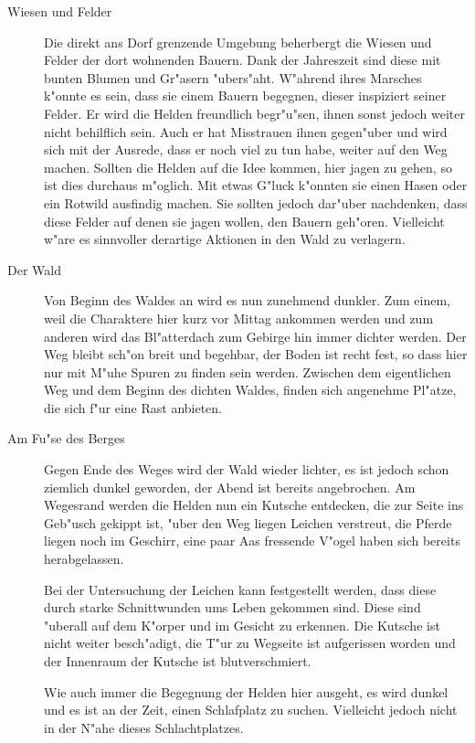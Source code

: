 \begin{description}
\item [Wiesen und Felder] Die direkt ans Dorf grenzende Umgebung beherbergt die Wiesen und Felder der dort wohnenden Bauern. Dank der Jahreszeit sind diese mit bunten Blumen und Gr"asern "ubers"aht. W"ahrend ihres Marsches k"onnte es sein, dass sie einem Bauern begegnen, dieser inspiziert seiner Felder. Er wird die Helden freundlich begr"u"sen, ihnen sonst jedoch weiter nicht behilflich sein. Auch er hat Misstrauen ihnen gegen"uber und wird sich mit der Ausrede, dass er noch viel zu tun habe, weiter auf den Weg machen. Sollten die Helden auf die Idee kommen, hier jagen zu gehen, so ist dies durchaus m"oglich. Mit etwas G"luck k"onnten sie einen Hasen oder ein Rotwild ausfindig machen. Sie sollten jedoch dar"uber nachdenken, dass diese Felder auf denen sie jagen wollen, den Bauern geh"oren. Vielleicht w"are es sinnvoller derartige Aktionen in den Wald zu verlagern.
\item[Der Wald] Von Beginn des Waldes an wird es nun zunehmend dunkler. Zum einem, weil die Charaktere hier kurz vor Mittag ankommen werden und zum anderen wird das Bl"atterdach zum Gebirge hin immer dichter werden. Der Weg bleibt sch"on breit und begehbar, der Boden ist recht fest, so dass hier nur mit M"uhe Spuren zu finden sein werden. Zwischen dem eigentlichen Weg und dem Beginn des dichten Waldes, finden sich angenehme Pl"atze, die sich f"ur eine Rast anbieten.
\item[Am Fu"se des Berges] Gegen Ende des Weges wird der Wald wieder lichter, es ist jedoch schon ziemlich dunkel geworden, der Abend ist bereits angebrochen. Am Wegesrand werden die Helden nun ein Kutsche entdecken, die zur Seite ins Geb"usch gekippt ist, "uber den Weg liegen Leichen verstreut, die Pferde liegen noch im Geschirr, eine paar Aas fressende V"ogel haben sich bereits herabgelassen.
\par Bei der Untersuchung der Leichen kann festgestellt werden, dass diese durch starke Schnittwunden ums Leben gekommen sind. Diese sind "uberall auf dem K"orper und im Gesicht zu erkennen. Die Kutsche ist nicht weiter besch"adigt, die T"ur zu Wegseite ist aufgerissen worden und der Innenraum der Kutsche ist blutverschmiert.
\par Wie auch immer die Begegnung der Helden hier ausgeht, es wird dunkel und es ist an der Zeit, einen Schlafplatz zu suchen. Vielleicht jedoch nicht in der N"ahe dieses Schlachtplatzes.
\end{description}

